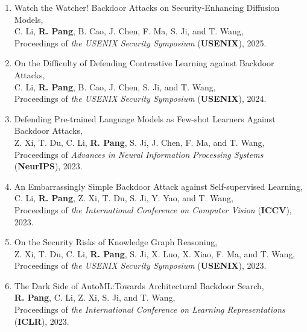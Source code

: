 \documentclass[letterpaper,11pt]{article}
\begin{document}
\begin{enumerate}[labelsep=15pt, parsep=-4pt]

    \item Watch the Watcher! Backdoor Attacks on Security-Enhancing Diffusion Models,\\
    C. Li, \textbf{R. Pang}, B. Cao, J. Chen, F. Ma, S. Ji, and T. Wang,\\
    Proceedings of {\it the USENIX Security Symposium\/} (\textbf{USENIX}), 2025.

    \item On the Difficulty of Defending Contrastive Learning against Backdoor Attacks,\\
    C. Li, \textbf{R. Pang}, B. Cao, J. Chen, S. Ji, and T. Wang,\\
    Proceedings of {\it the USENIX Security Symposium\/} (\textbf{USENIX}), 2024.

    \item Defending Pre-trained Language Models as Few-shot Learners Against Backdoor Attacks,\\
    Z. Xi, T. Du, C. Li, \textbf{R. Pang}, S. Ji, J. Chen, F. Ma, and T. Wang,\\
    Proceedings of {\it Advances in Neural Information Processing Systems\/} (\textbf{NeurIPS}), 2023.
    
    \item An Embarrassingly Simple Backdoor Attack against Self-supervised Learning,\\
    C. Li, \textbf{R. Pang}, Z. Xi, T. Du, S. Ji, Y. Yao, and T. Wang,\\
    Proceedings of {\it the International Conference on Computer Vision\/} (\textbf{ICCV}), 2023.
    
    \item On the Security Risks of Knowledge Graph Reasoning,\\
    Z. Xi, T. Du, C. Li, \textbf{R. Pang}, S. Ji, X. Luo, X. Xiao, F. Ma, and T. Wang,\\
    Proceedings of {\it the USENIX Security Symposium\/} (\textbf{USENIX}), 2023.
    
    \item The Dark Side of AutoML:\@ Towards Architectural Backdoor Search,\\
    \textbf{R. Pang}, C. Li, Z. Xi, S. Ji, and T. Wang,\\
    Proceedings of {\it the International Conference on Learning Representations\/} (\textbf{ICLR}), 2023.
    

\end{enumerate}
\end{document}
